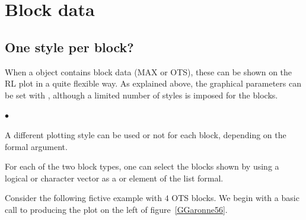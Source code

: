 \documentclass[a4paper]{report}
\begin{document}
\section{Block data} 
\label{secBlockData}

\subsection{One style per block?}
When a \verb@Renouv@ object contains block data (MAX or OTS), these can
be shown on the RL plot in a quite flexible way. As explained above, the graphical 
parameters can be set with \verb@RLpar@, although a limited number of 
styles is imposed for the blocks.

\begin{list}{$\bullet$}{ }

\item A different plotting style can be used or not for each block, depending on
  the \verb@byBlockStyle@ formal argument.

\item For each of the two block types, one can select the blocks shown by using
  a logical or character vector as a \verb@MAX@ or \verb@OTS@ element of the
\verb@show@ list formal.

\end{list}

Consider the following fictive example with $4$ OTS blocks. We begin with 
a basic call to \verb@plot@ producing the plot on the left of
figure~\ref{GGaronne56}.
\end{document}
